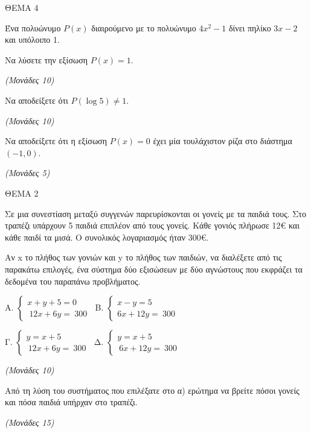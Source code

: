 \documentclass[11pt,a4paper,twoside]{book}
\newcommand{\monades}[1]{\hfill \textit{(Μονάδες #1)}}
\begin{document}
\vspace{4mm}

ΘΕΜΑ 4

Ένα πολυώνυμο $P(x)$ διαιρούμενο με το πολυώνυμο $4x^2 - 1$ δίνει πηλίκο $3x - 2$ και υπόλοιπο 1.

\begin{alist}
\item Να λύσετε την εξίσωση $P(x) = 1$.

\monades{10}

\item Να αποδείξετε ότι $P(\log 5) \neq 1$.

\monades{10}

\item Να αποδείξετε ότι η εξίσωση $P(x) = 0$ έχει μία τουλάχιστον ρίζα στο διάστημα $(-1, 0)$.

\monades{5}
\end{alist}

\vspace{4mm}

ΘΕΜΑ 2

Σε μια συνεστίαση μεταξύ συγγενών παρευρίσκονται οι γονείς με τα παιδιά τους. Στο τραπέζι υπάρχουν 5 παιδιά επιπλέον από τους γονείς. Κάθε γονιός πλήρωσε 12€ και κάθε παιδί τα μισά. Ο συνολικός λογαριασμός ήταν 300€.

\begin{alist}
\item Αν x το πλήθος των γονιών και y το πλήθος των παιδιών, να διαλέξετε από τις παρακάτω επιλογές, ένα σύστημα δύο εξισώσεων με δύο αγνώστους που εκφράζει τα δεδομένα του παραπάνω προβλήματος.

Α. \(\left\{ \begin{array}{r}
x + y + 5 = 0\ \  \\
\ 12x + 6y = \ 300
\end{array} \right.\ \) Β. \(\left\{ \begin{array}{r}
x - y = 5\ \  \\
6x + 12y = \ 300
\end{array} \right.\ \)

Γ. \(\left\{ \begin{array}{r}
y = x + 5\ \  \\
\ 12x + 6y = \ 300
\end{array} \right.\ \) Δ. \(\left\{ \begin{array}{r}
y = x + 5\ \  \\
\ 6x + 12y = \ 300
\end{array} \right.\ \)

\monades{10}

\item Από τη λύση του συστήματος που επιλέξατε στο α) ερώτημα να βρείτε πόσοι γονείς και πόσα παιδιά υπήρχαν στο τραπέζι.

\monades{15}
\end{alist}
\end{document}
